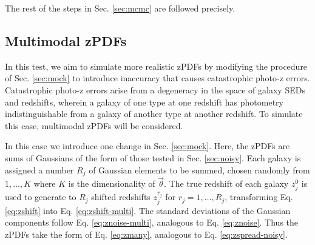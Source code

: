 \documentclass[preprint]{aastex}
\begin{document}
The rest of the steps in Sec. \ref{sec:mcmc} are followed precisely.

%
%
%

\clearpage
\subsection{Multimodal zPDFs}
\label{sec:multi}

In this test, we aim to simulate more realistic zPDFs by modifying the procedure of Sec. \ref{sec:mock} to introduce inaccuracy that causes catastrophic photo-z errors.  Catastrophic photo-z errors arise from a degeneracy in the space of galaxy SEDs and redshifts, wherein a galaxy of one type at one redshift has photometry indistinguishable from a galaxy of another type at another redshift.  To simulate this case, multimodal zPDFs will be considered.

In this case we introduce one change in Sec. \ref{sec:mock}.  Here, the zPDFs are sums of Gaussians of the form of those tested in Sec. \ref{sec:noisy}.  Each galaxy is assigned a number $R_{j}$ of Gaussian elements to be summed, chosen randomly from $1,\dots,K$ where $K$ is the dimensionality of $\vec{\theta}$.  The true redshift of each galaxy $z_{j}^{0}$ is used to generate to $R_{j}$ shifted redshifts $z^{r_{j}}_{j}$ for $r_{j}=1,\dots,R_{j}$, transforming Eq. \ref{eq:zshift} into Eq. \ref{eq:zshift-multi}.  The standard deviations of the Gaussian components follow Eq. \ref{eq:znoise-multi}, analogous to Eq. \ref{eq:znoise}.  Thus the zPDFs take the form of Eq. \ref{eq:zmany}, analogous to Eq. \ref{eq:zspread-noisy}.  
\end{document}
